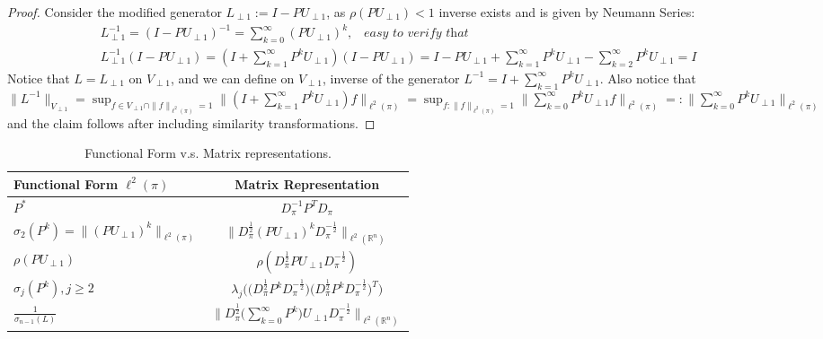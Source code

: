 \documentclass[preprint]{imsart}
\theoremstyle{plain}
\theoremstyle{definition}
\begin{document}
\begin{proof}
    
Consider the modified generator $L_{\perp 1}:=I-PU_{\perp 1}$, as $\rho(PU_{\perp 1})<1$ inverse exists and is given by Neumann Series:
\begin{align}
    & \nonumber L^{-1}_{\perp 1}=(I-PU_{\perp 1})^{-1}=\sum_{k=0}^{\infty}(PU_{\perp 1})^{k}, \hspace{10pt} \textit{easy to verify that} \\ & L^{-1}_{\perp 1}(I-PU_{\perp 1})  = (I+\sum_{k=1}^{\infty}P^{k}U_{\perp 1})(I-PU_{\perp 1})=I-PU_{\perp 1}+\sum_{k=1}^{\infty}P^{k}U_{\perp 1}-\sum_{k=2}^{\infty}P^{k}U_{\perp 1}=I
\end{align}  
Notice that $L=L_{\perp 1}$ on $V_{\perp 1}$, and we can define on $V_{\perp 1}$, inverse of the generator $L^{-1}=I+\sum_{k=1}^{\infty}P^{k}U_{\perp 1}$. Also notice that $\|L^{-1}\|_{V_{\perp 1}}=\sup_{f \in V_{\perp 1}\cap\|f\|_{\ell^{2}(\pi)}=1}\|(I+\sum_{k=1}^{\infty}P^{k}U_{\perp 1})f\|_{\ell^{2}(\pi)}=\sup_{f:\|f\|_{\ell^{2}(\pi)}=1}\|\sum_{k=0}^{\infty}P^{k}U_{\perp 1}f\|_{\ell^{2}(\pi)}=:\|\sum_{k=0}^{\infty}P^{k}U_{\perp 1}\|_{\ell^{2}(\pi)}$ and the claim follows after including similarity transformations. \end{proof}

\begin{table}[h!]
\centering
\begin{tabular}{|l|c|}
\hline
\textbf{Functional Form} $\ell^{2}(\pi)$ & \textbf{Matrix Representation} \\ 
\hline
$P^{*}$ & $D_{\pi}^{-1} P^{T} D_{\pi}$ \\ 
\hline
$\sigma_{2}(P^{k})=\big\|(PU_{\perp 1})^{k}\big\|_{\ell^{2}(\pi)} $ & $\|D_{\pi}^{\frac{1}{2}}(PU_{\perp 1})^{k}D_{\pi}^{-\frac{1}{2}}\|_{\ell^{2}(\mathbb{R}^n)}$ \\ 
\hline
$\rho(PU_{\perp 1}) $ & $\rho(D_{\pi}^{\frac{1}{2}}PU_{\perp 1}D_{\pi}^{-\frac{1}{2}})$ \\
\hline
$\sigma_{j}(P^{k}), j \geq 2$ & $\lambda_{j}\Big(\big(D_{\pi}^{\frac{1}{2}}P^{k}D_{\pi}^{-\frac{1}{2}}\big)\big(D_{\pi}^{\frac{1}{2}}P^{k}D_{\pi}^{-\frac{1}{2}}\big)^{T}\Big)$ \\
\hline
$\frac{1}{\sigma_{n-1}(L)}$ & $ \bigg\|D_{\pi}^{\frac{1}{2}}\Big(\sum_{k=0}^{\infty}P^{k}\Big)U_{\perp 1}D_{\pi}^{-\frac{1}{2}}\bigg\|_{\ell^{2}(\mathbb{R}^{n})}$ \\
\hline
\end{tabular}
\caption{Functional Form v.s. Matrix representations.}
\label{tab:func_vs_mat}
\end{table}
\end{document}

